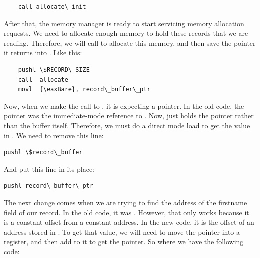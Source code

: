 \begin{simpletyping}
\begin{lstlisting}
	call allocate\_init
\end{lstlisting}
\end{simpletyping}

After that, the memory manager is ready to start servicing memory allocation requests.
We need to allocate enough memory to hold these records that we are reading.  Therefore,
we will call  to allocate this memory, and then save the
pointer it returns into .  Like this:

\begin{simpletyping}
\begin{lstlisting}
	pushl \$RECORD\_SIZE
	call  allocate
	movl  {\eaxBare}, record\_buffer\_ptr
\end{lstlisting}
\end{simpletyping}

Now, when we make the call to , it is expecting a pointer.
In the old code, the pointer was the immediate-mode reference to 
.  Now,  just holds
the pointer rather than the buffer itself.  Therefore, we must do a direct mode load
to get the value in .  We need to remove this line:

\begin{simpletyping}
\begin{lstlisting}
pushl \$record\_buffer
\end{lstlisting}
\end{simpletyping}

And put this line in its place:

\begin{simpletyping}
\begin{lstlisting}
pushl record\_buffer\_ptr
\end{lstlisting}
\end{simpletyping}

The next change comes when we are trying to find the address of the 
firstname field of our record.  In the old code, it was 
.  However, that
only works because it is a constant offset from a constant address.
In the new code, it is the offset of an address stored in 
.  To get that value, we will need
to move the pointer into a register, and then add 
to it to get the pointer.  So where we have the following code:

